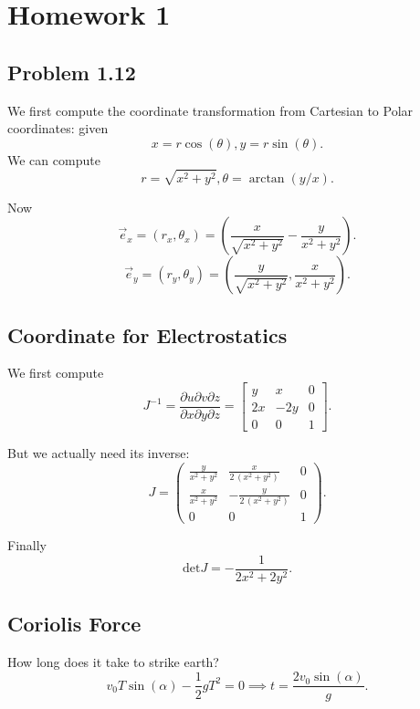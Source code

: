 
\section{Homework 1}

\subsection{Problem 1.12}

We first compute the coordinate transformation from Cartesian to Polar coordinates: given
\[
	x = r \cos(\theta), y = r \sin(\theta)
.\] 
We can compute
\[
	r = \sqrt{x^2 + y^2} , \theta = \arctan (y / x)
.\] 

Now
\[
	\vec{e} _x = \left( r_x, \theta_x \right)  = \left( \frac{x}{\sqrt{x^2 + y^2} } - \frac{y}{x^2 + y^2} \right) 
.\] 
\[
	\vec{e} _y = \left( r_y, \theta_y \right)  = \left( \frac{y}{\sqrt{x^2 + y^2} }, \frac{x}{x^2 + y^2} \right) 
.\] 

\subsection{Coordinate for Electrostatics}

We first compute
\[
	J^{-1} = \frac{\partial u \partial v \partial z}{ \partial x \partial y \partial z} = 
	\begin{bmatrix}
y & x & 0\\ 
2x & -2y & 0\\ 
0 & 0 & 1
\end{bmatrix}
.\] 

But we actually need its inverse:
\[
	J = 
\left(\begin{array}{rrr}
\frac{y}{x^{2} + y^{2}} & \frac{x}{2 \, {\left(x^{2} + y^{2}\right)}} & 0 \\
\frac{x}{x^{2} + y^{2}} & -\frac{y}{2 \, {\left(x^{2} + y^{2}\right)}} & 0 \\
0 & 0 & 1
\end{array}\right)
.\] 

Finally
\[
	\text{det} J = - \frac{1}{2x^2 + 2 y^2}
.\] 


\subsection{Coriolis Force}

How long does it take to strike earth?
\[
	v_0 T \sin(\alpha) - \frac{1}{2}  g T^2 = 0 \implies t = \frac{2 v_0 \sin(\alpha)}{g}
.\] 


